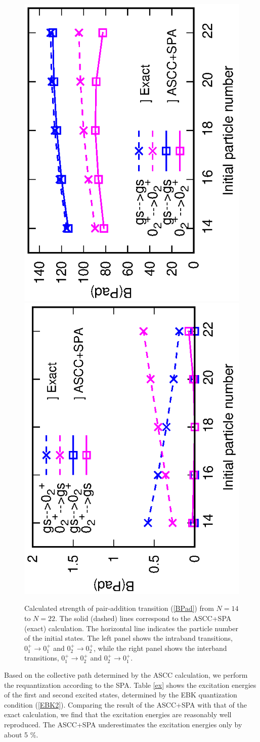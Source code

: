 \documentclass[11pt]{book} %
\begin{document}
\begin{figure}[htbp]
 \begin{minipage}{1\hsize}
 \begin{center}
  \includegraphics[height=0.45\textwidth,angle=-90]{images/intra_trans.eps}
  \includegraphics[height=0.45\textwidth,angle=-90]{images/inter_trans.eps}
 \end{center}
 \end{minipage}
\caption{Calculated strength of pair-addition transition (\ref{BPad})
from $N=14$ to $N=22$. 
The solid (dashed) lines correspond to the ASCC+SPA (exact) calculation.
The horizontal line indicates the particle number of the initial states.
The left panel shows the intraband transitions,
$0_1^+\to 0_1^+$ and $0_2^+\to 0_2^+$,
while the right panel shows the interband transitions,
$0_1^+ \to 0_2^+$ and $0_2^+\to 0_1^+$.
}
 \label{3levelPad}
\end{figure}

Based on the collective path determined by the ASCC calculation,
we perform the requantization according to the SPA.
Table \ref{ex} shows the excitation energies of the first and second
excited states, determined by the EBK quantization condition (\ref{EBK2}).
Comparing the result of the ASCC+SPA with that of the exact calculation,
we find that the excitation energies are reasonably well reproduced. 
The ASCC+SPA underestimates the excitation energies only by about 5 \%.
\end{document}
